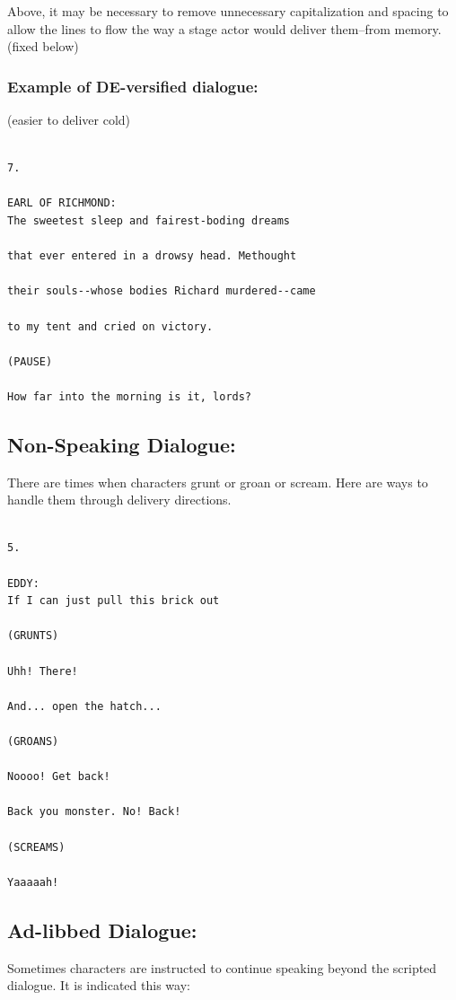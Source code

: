 \documentclass[openleft,oneside,showtrims]{memoir}
\begin{document}
Above, it may be necessary to remove unnecessary capitalization and spacing to allow the lines to flow the way a stage actor would deliver them--from memory. (fixed below)

\subsubsection*{Example of DE-versified dialogue:}
\label{sec:org6f15c59}
(easier to deliver cold)

\lstset{language=fountain,label= ,caption= ,captionpos=b,numbers=none}
\begin{lstlisting}

7.

EARL OF RICHMOND:
The sweetest sleep and fairest-boding dreams
  
that ever entered in a drowsy head. Methought
  
their souls--whose bodies Richard murdered--came
  
to my tent and cried on victory.
  
(PAUSE)
  
How far into the morning is it, lords?

\end{lstlisting}
\subsection{Non-Speaking Dialogue:}
\label{sec:org7af6e82}
There are times when characters grunt or groan or scream. Here are ways to handle them through delivery directions.

\lstset{language=fountain,label= ,caption= ,captionpos=b,numbers=none}
\begin{lstlisting}

5.

EDDY:
If I can just pull this brick out
  
(GRUNTS)
  
Uhh! There!
  
And... open the hatch...
  
(GROANS)
  
Noooo! Get back!
  
Back you monster. No! Back!
  
(SCREAMS)
  
Yaaaaah!

\end{lstlisting}
\subsection{Ad-libbed Dialogue:}
\label{sec:orgabb7413}
Sometimes characters are instructed to continue speaking beyond the scripted dialogue. It is indicated this way:
\end{document}

